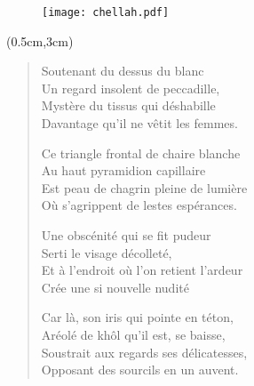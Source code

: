 \begin{figure}[h]
\centering
\texttt{[image: chellah.pdf]}
\captionsetup{labelformat=empty}
\caption[Idéotexte du  (\textarabic{شالة})]{}
\end{figure}

\newpage{}
\begin{textblock*}{8cm}(0.5cm,3cm) 
\begin{verse}\quatrain
  Soutenant du dessus du blanc \label{foot.litham}\\  %
  Un regard insolent de peccadille,\\  %
  Mystère du tissus qui déshabille\\  %
  Davantage qu’il ne vêtit les femmes.

  Ce triangle frontal de chaire blanche\\  %
  Au haut pyramidion capillaire\\  %
  Est peau de chagrin pleine de lumière\\  %
  Où s’agrippent de lestes espérances.

  Une obscénité qui se fit pudeur\\  %
  Serti le visage décolleté,\\  %
  Et à l’endroit où l’on retient l’ardeur\\  %
  Crée une si nouvelle nudité


  Car là, son iris qui pointe en téton, \\  %
  Aréolé de khôl qu’il est, se baisse, \\  %
  Soustrait aux regards ses délicatesses, \\  %
  Opposant des sourcils en un auvent.  %


\end{verse}
\end{textblock*}
